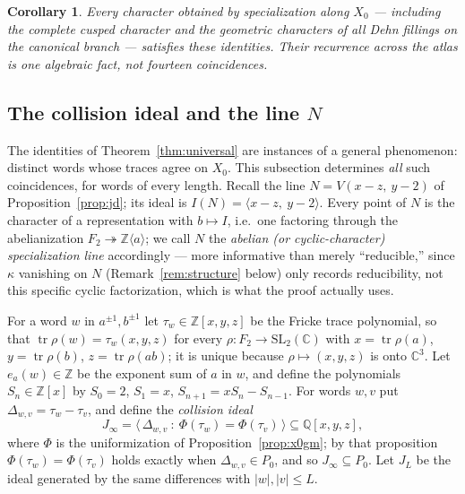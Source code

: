 \documentclass[11pt,a4paper]{article}
\newtheorem{corollary}[theorem]{Corollary}
\theoremstyle{definition}
\theoremstyle{remark}
\newcommand{\tr}{\operatorname{tr}}
\newcommand{\SLtwo}{\mathrm{SL}_2(\mathbb{C})}
\newcommand{\Q}{\mathbb{Q}}
\newcommand{\Z}{\mathbb{Z}}
\begin{document}
\begin{corollary}
Every character obtained by specialization along $X_0$ --- including
the complete cusped character and the geometric characters of all
Dehn fillings on the canonical branch --- satisfies these identities.
Their recurrence across the atlas is one algebraic fact, not fourteen
coincidences.
\end{corollary}

\subsection{The collision ideal and the line $N$}
\label{sec:collision}

The identities of Theorem~\ref{thm:universal} are instances of a general
phenomenon: distinct words whose traces agree on $X_0$. This subsection
determines \emph{all} such coincidences, for words of every length. Recall
the line $N = V(x-z,\ y-2)$ of Proposition~\ref{prop:jd}; its ideal is
$I(N)=\langle x-z,\ y-2\rangle$. Every point of $N$ is the character of a
representation with $b\mapsto I$, i.e.\ one factoring through the
abelianization $F_2\twoheadrightarrow\Z\langle a\rangle$; we call $N$ the
\emph{abelian (or cyclic-character) specialization line} accordingly ---
more informative than merely ``reducible,'' since $\kappa$ vanishing on
$N$ (Remark~\ref{rem:structure} below) only records reducibility, not
this specific cyclic factorization, which is what the proof actually uses.

For a word $w$ in $a^{\pm1},b^{\pm1}$ let $\tau_w\in\Z[x,y,z]$ be the
Fricke trace polynomial, so that $\tr\rho(w)=\tau_w(x,y,z)$ for every
$\rho:F_2\to\SLtwo$ with $x=\tr\rho(a)$, $y=\tr\rho(b)$, $z=\tr\rho(ab)$;
it is unique because $\rho\mapsto(x,y,z)$ is onto $\mathbb{C}^3$. Let
$e_a(w)\in\Z$ be the exponent sum of $a$ in $w$, and define the
polynomials $S_n\in\Z[x]$ by $S_0=2$, $S_1=x$, $S_{n+1}=xS_n-S_{n-1}$.
For words $w,v$ put $\Delta_{w,v}=\tau_w-\tau_v$, and define the
\emph{collision ideal}
\begin{equation}
J_\infty=\bigl\langle\,\Delta_{w,v}\ :\ \Phi(\tau_w)=\Phi(\tau_v)\,\bigr\rangle
\subseteq\Q[x,y,z],
\end{equation}
where $\Phi$ is the uniformization of Proposition~\ref{prop:x0gm}; by that
proposition $\Phi(\tau_w)=\Phi(\tau_v)$ holds exactly when
$\Delta_{w,v}\in P_0$, and so $J_\infty\subseteq P_0$. Let $J_L$ be the
ideal generated by the same differences with $|w|,|v|\le L$.
\end{document}
